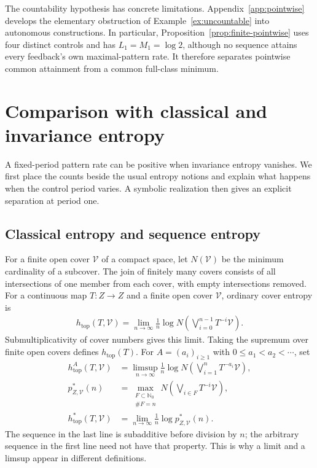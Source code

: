 \documentclass[11pt,reqno]{amsart}
\numberwithin{equation}{section}
\theoremstyle{definition}
\theoremstyle{definition}
\begin{document}
The countability hypothesis has concrete limitations.
Appendix~\ref{app:pointwise} develops the elementary obstruction
of Example~\ref{ex:uncountable} into autonomous constructions.
In particular, Proposition~\ref{prop:finite-pointwise}
uses four distinct controls and has $L_1=M_1=\log2$, although no
sequence attains every feedback's own maximal-pattern rate. It therefore
separates pointwise common attainment from a common full-class minimum.


\section{Comparison with classical and invariance entropy}\label{sec:comparison}

A fixed-period pattern rate can be positive when invariance entropy
vanishes. We first place the counts beside the usual entropy notions
and explain what happens when the control period varies. A symbolic
realization then gives an explicit separation at period one.

\subsection{Classical entropy and sequence entropy}\label{sec:background}

For a finite open cover $\mathcal V$ of a compact space,
let $N(\mathcal V)$ be the minimum
cardinality of a subcover. The join of finitely many covers consists of
all intersections of one member from each cover, with empty intersections
removed. For a continuous map $T:Z\to Z$ and a finite open cover
$\mathcal V$, ordinary cover entropy is
\begin{align*}
 h_{\mathrm{top}}(T,\mathcal V)
 =\lim_{n\to\infty}\frac1n\log N\left(
 \bigvee_{i=0}^{n-1}T^{-i}\mathcal V\right).
\end{align*}
Submultiplicativity of cover numbers gives this limit. Taking the
supremum over finite open covers defines $h_{\mathrm{top}}(T)$.
For $A=(a_i)_{i\ge1}$ with $0\le a_1<a_2<\cdots$, set
\begin{align*}
 h_{\mathrm{top}}^A(T,\mathcal V)
 &=\limsup_{n\to\infty}\frac1n\log N\left(
     \bigvee_{i=1}^nT^{-a_i}\mathcal V\right),\\
 p_{Z,\mathcal V}^*(n)
 &=\max_{\substack{F\subset\mathbb N_0\\\#F=n}}
    N\left(\bigvee_{i\in F}T^{-i}\mathcal V\right),\\
 h_{\mathrm{top}}^*(T,\mathcal V)
 &=\lim_{n\to\infty}\frac1n\log p_{Z,\mathcal V}^*(n).
\end{align*}
The sequence in the last line is subadditive before division by $n$;
the arbitrary sequence in the first line need not have that property.
This is why a limit and a limsup appear in different definitions.
\end{document}
